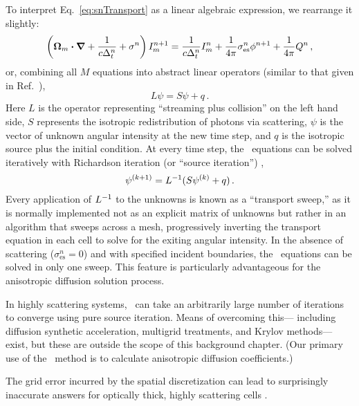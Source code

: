 To interpret Eq.~\eqref{eq:snTransport} as a linear algebraic expression, we
rearrange it slightly:
\begin{equation*}
  \left( \bm{\Omega}_{m} \bm{\cdot} \bm{\nabla} + \frac{1}{c\Delta_t^n}
  + \sigma^n \right) I_{m}^{n+1}
  = \frac{1}{c\Delta_t^n} I_{m}^n
  + \frac{1}{4\pi} \sigma_\mathrm{es}^n \phi^{n+1}
  + \frac{1}{4\pi} Q^n \,,
\end{equation*}
or, combining all $M$ equations into abstract linear operators (similar to
that given in Ref.~\cite{War2004}),
\begin{equation*}
  L \psi = S \psi + q\,.
\end{equation*}
Here $L$ is the operator representing ``streaming plus collision'' on the left
hand side, $S$ represents the isotropic redistribution of photons via
scattering, $\psi$ is the vector of unknown angular intensity at the new time
step, and $q$ is the isotropic source plus the initial condition. At every time
step, the \SN\ equations can be solved iteratively with Richardson
iteration (or ``source iteration'') \cite{Lew1984},
\begin{equation*}
  \psi^{(k+1)} = L^{-1} ( S \psi^{(k)} + q )\,.
\end{equation*}
Every application of $L^{-1}$ to the unknowns is known as a ``transport sweep,''
as it is normally implemented not as an explicit matrix of unknowns but rather in
an algorithm that sweeps across a mesh, progressively inverting the transport
equation in each cell to solve for the exiting angular intensity.
In the absence of scattering ($\sigma_\mathrm{es}^n=0$) and with specified
incident boundaries,
the \SN\ equations can be solved in only one sweep. This feature is particularly
advantageous for the anisotropic diffusion solution process.

In highly scattering systems, \SN\ can take an arbitrarily large number of
iterations to converge
using pure source iteration. Means of overcoming this---%
including diffusion
synthetic acceleration, multigrid treatments, and Krylov methods---%
exist, but these are
outside the scope of this background chapter. (Our primary use of the \SN\ method
is to calculate anisotropic diffusion coefficients.)

The grid error incurred by the spatial discretization can lead to surprisingly
inaccurate answers for optically thick, highly scattering cells
\cite{Ada1998a,Ada2001}.

